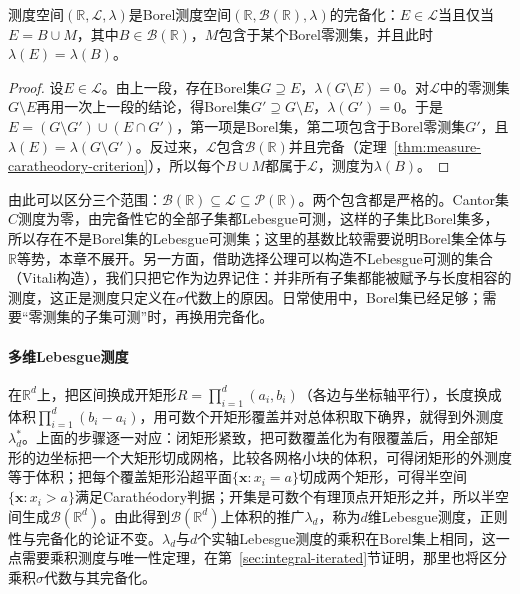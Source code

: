 \begin{theorem}[Lebesgue测度是Borel测度的完备化]
\label{thm:measure-lebesgue-completion}
测度空间$(\mathbb R,\mathcal L,\lambda)$是Borel测度空间$(\mathbb R,\mathcal B(\mathbb R),\lambda)$的完备化：$E\in\mathcal L$当且仅当$E=B\cup M$，其中$B\in\mathcal B(\mathbb R)$，$M$包含于某个Borel零测集，并且此时$\lambda(E)=\lambda(B)$。
\end{theorem}

\begin{proof}
设$E\in\mathcal L$。由上一段，存在Borel集$G\supseteq E$，$\lambda(G\setminus E)=0$。对$\mathcal L$中的零测集$G\setminus E$再用一次上一段的结论，得Borel集$G'\supseteq G\setminus E$，$\lambda(G')=0$。于是$E=(G\setminus G')\cup(E\cap G')$，第一项是Borel集，第二项包含于Borel零测集$G'$，且$\lambda(E)=\lambda(G\setminus G')$。反过来，$\mathcal L$包含$\mathcal B(\mathbb R)$并且完备（定理~\ref{thm:measure-caratheodory-criterion}），所以每个$B\cup M$都属于$\mathcal L$，测度为$\lambda(B)$。
\end{proof}

由此可以区分三个范围：$\mathcal B(\mathbb R)\subseteq\mathcal L\subseteq\mathcal P(\mathbb R)$。两个包含都是严格的。Cantor集$C$测度为零，由完备性它的全部子集都Lebesgue可测，这样的子集比Borel集多，所以存在不是Borel集的Lebesgue可测集；这里的基数比较需要说明Borel集全体与$\mathbb R$等势，本章不展开。另一方面，借助选择公理可以构造不Lebesgue可测的集合（Vitali构造），我们只把它作为边界记住：并非所有子集都能被赋予与长度相容的测度，这正是测度只定义在$\sigma$代数上的原因。日常使用中，Borel集已经足够；需要“零测集的子集可测”时，再换用完备化。

\paragraph{多维Lebesgue测度}
在$\mathbb R^d$上，把区间换成开矩形$R=\prod_{i=1}^d(a_i,b_i)$（各边与坐标轴平行），长度换成体积$\prod_{i=1}^d(b_i-a_i)$，用可数个开矩形覆盖并对总体积取下确界，就得到外测度$\lambda_d^*$。上面的步骤逐一对应：闭矩形紧致，把可数覆盖化为有限覆盖后，用全部矩形的边坐标把一个大矩形切成网格，比较各网格小块的体积，可得闭矩形的外测度等于体积；把每个覆盖矩形沿超平面$\{\bm x:x_i=a\}$切成两个矩形，可得半空间$\{\bm x:x_i>a\}$满足Carathéodory判据；开集是可数个有理顶点开矩形之并，所以半空间生成$\mathcal B(\mathbb R^d)$。由此得到$\mathcal B(\mathbb R^d)$上体积的推广$\lambda_d$，称为$d$维Lebesgue测度，正则性与完备化的论证不变。$\lambda_d$与$d$个实轴Lebesgue测度的乘积在Borel集上相同，这一点需要乘积测度与唯一性定理，在第~\ref{sec:integral-iterated}节证明，那里也将区分乘积$\sigma$代数与其完备化。

